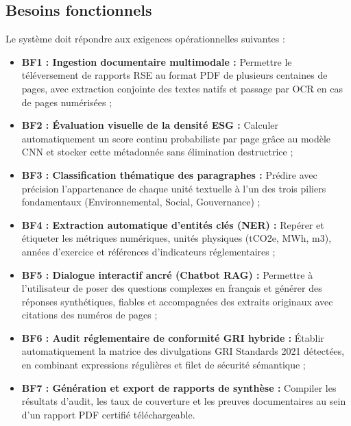 \documentclass[12pt,a4paper]{report}
\begin{document}
\subsection{Besoins fonctionnels}
Le système doit répondre aux exigences opérationnelles suivantes :
\begin{itemize}
    \item \textbf{BF1 : Ingestion documentaire multimodale :} Permettre le téléversement de rapports RSE au format PDF de plusieurs centaines de pages, avec extraction conjointe des textes natifs et passage par OCR en cas de pages numérisées ;
    \item \textbf{BF2 : Évaluation visuelle de la densité ESG :} Calculer automatiquement un score continu probabiliste par page grâce au modèle CNN et stocker cette métadonnée sans élimination destructrice ;
    \item \textbf{BF3 : Classification thématique des paragraphes :} Prédire avec précision l'appartenance de chaque unité textuelle à l'un des trois piliers fondamentaux (Environnemental, Social, Gouvernance) ;
    \item \textbf{BF4 : Extraction automatique d'entités clés (NER) :} Repérer et étiqueter les métriques numériques, unités physiques (tCO2e, MWh, m3), années d'exercice et références d'indicateurs réglementaires ;
    \item \textbf{BF5 : Dialogue interactif ancré (Chatbot RAG) :} Permettre à l'utilisateur de poser des questions complexes en français et générer des réponses synthétiques, fiables et accompagnées des extraits originaux avec citations des numéros de pages ;
    \item \textbf{BF6 : Audit réglementaire de conformité GRI hybride :} Établir automatiquement la matrice des divulgations GRI Standards 2021 détectées, en combinant expressions régulières et filet de sécurité sémantique ;
    \item \textbf{BF7 : Génération et export de rapports de synthèse :} Compiler les résultats d'audit, les taux de couverture et les preuves documentaires au sein d'un rapport PDF certifié téléchargeable.
\end{itemize}
\end{document}

